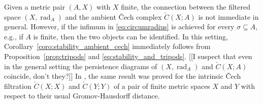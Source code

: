 \documentclass[8pt,a4paper,oneside,english,english]{article}
\theoremstyle{plain}
\theoremstyle
{plain}
\theoremstyle{definition}
\DeclareMathOperator{\rad}{rad}
\begin{document}
Given a metric pair $(A,X)$ with $X$ finite, the connection between the filtered space $(X,\rad_A)$ and the ambient \v{C}ech complex $\check{C}(X;A)$ is not immediate in general. However, if the infimum in \eqref{eq:circumradius} is achieved for every $\sigma\subseteq A$, e.g., if $A$ is finite, then the two objects can be identified. In this setting, Corollary~\ref{coro:stability_ambient_cech} immediately follows from Proposition~\ref{prop:tripods} and \eqref{eq:stability_and_tripods}. [[I suspect that even in the general setting the persistence diagrams of $(X,\rad_A)$ and $\check{C}(X;A)$ coincide, don't they?]] In \cite[Proposition 5.2]{Mem_tripods}, the same result was proved for the intrinsic \v{C}ech filtration $\check{C}(X;X)$ and $\check{C}(Y;Y)$ of a pair of finite metric spaces $X$ and $Y$ with respect to their usual Gromov-Hausdorff distance.
\end{document}
